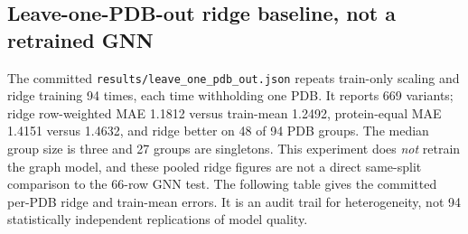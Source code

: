 \subsection{Leave-one-PDB-out ridge baseline, not a retrained GNN}
The committed \texttt{results/leave\_one\_pdb\_out.json} repeats train-only scaling and ridge training 94 times, each time withholding one PDB. It reports 669 variants; ridge row-weighted MAE 1.1812 versus train-mean 1.2492, protein-equal MAE 1.4151 versus 1.4632, and ridge better on 48 of 94 PDB groups. The median group size is three and 27 groups are singletons. This experiment does \emph{not} retrain the graph model, and these pooled ridge figures are not a direct same-split comparison to the 66-row GNN test.
The following table gives the committed per-PDB ridge and train-mean errors. It is an audit trail for heterogeneity, not 94 statistically independent replications of model quality.
